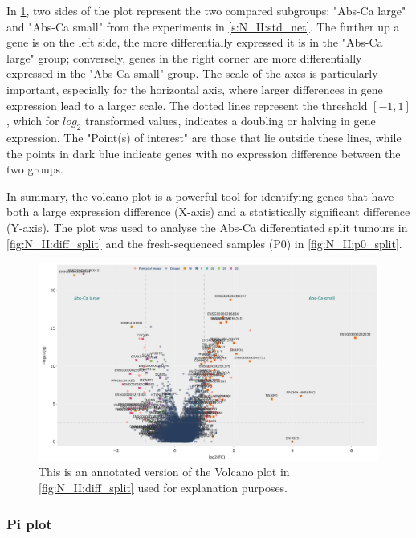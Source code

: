 In \cref{fig:lit:dea_eg}, two sides of the plot represent the two compared subgroups: "Abs-Ca large" and "Abs-Ca small" from the experiments in \cref{s:N_II:std_net}. The further up a gene is on the left side, the more differentially expressed it is in the "Abs-Ca large" group; conversely, genes in the right corner are more differentially expressed in the "Abs-Ca small" group. The scale of the axes is particularly important, especially for the horizontal axis, where larger differences in gene expression lead to a larger scale. The dotted lines represent the threshold $[-1, 1]$, which for $log_{2}$ transformed values, indicates a doubling or halving in gene expression. The "Point(s) of interest" are those that lie outside these lines, while the points in dark blue indicate genes with no expression difference between the two groups.

In summary, the volcano plot is a powerful tool for identifying genes that have both a large expression difference (X-axis) and a statistically significant difference (Y-axis). The plot was used to analyse the Abs-Ca differentiated split tumours in \cref{fig:N_II:diff_split} and the fresh-sequenced samples (P0) in \cref{fig:N_II:p0_split}.

\begin{figure}[H] 
    \centering
    \includegraphics[width=1.0\textwidth,height=1.0\textheight,keepaspectratio]{Sections/Network_II/resources/non_tum/diff_split_dea.png}
    \caption{This is an annotated version of the Volcano plot in \cref{fig:N_II:diff_split} used for explanation purposes.}
    \label{fig:lit:dea_eg}
\end{figure}



\subsubsection{Pi plot} \label{s:lit:pi}

